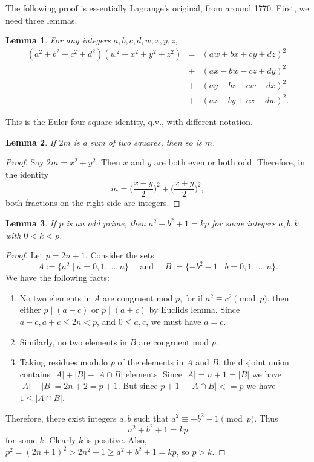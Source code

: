 \documentclass[12pt]{article}
\newtheorem{lem}{Lemma}
\begin{document}

The following proof is essentially Lagrange's original, from around 1770.  First, we need three lemmas.

\begin{lem} For any integers $a,b,c,d,w,x,y,z$, 
\begin{eqnarray*}
(a^2+b^2+c^2+d^2)(w^2+x^2+y^2+z^2) & = & (aw+bx+cy+dz)^2 \\
& + & (ax-bw-cz+dy)^2 \\
& + & (ay+bz-cw-dx)^2 \\
& + & (az-by+cx-dw)^2.
\end{eqnarray*}
\end{lem}
This is the Euler four-square identity, q.v., with different notation.

\begin{lem} If $2m$ is a sum of two squares, then so is $m$.\end{lem}

\begin{proof} Say $2m=x^2+y^2$. Then $x$ and $y$ are both even or both odd.
Therefore, in the identity $$m=\Big(\frac{x-y}{2}\Big)^2 +
\Big(\frac{x+y}{2}\Big)^2,$$
both fractions on the right side are integers. \end{proof}

\begin{lem} If $p$ is an odd prime,
then $a^2+b^2+1=kp$ for some integers $a,b,k$ with $0<k<p$. \end{lem}

\begin{proof} Let $p = 2n + 1$.  Consider the sets $$A:=\lbrace a^2 \mid a=0,1,...,n\rbrace\quad\mbox{ and }\quad B:=\lbrace -b^2-1 \mid b=0,1,...,n \rbrace.$$  We have the following facts:
\begin{enumerate}
\item No two elements in $A$ are congruent mod $p$, for if $a^2\equiv c^2 \pmod p$, then either $p\mid (a-c)$ or $p\mid (a+c)$ by Euclids lemma.  Since $a-c, a+c \le 2n< p$, and $0\le a,c$, we must have $a=c$.  
\item Similarly, no two elements in $B$ are congruent mod $p$.  
\item Taking residues modulo $p$ of the elements in $A$ and $B$, the disjoint union contains $\lvert A \rvert +\lvert B\rvert -\lvert A \cap B\rvert$ elements.
Since $\lvert A \rvert =n +1 =\lvert B \rvert$ we have $\lvert A\rvert +\lvert B \rvert =2n +2=p+1$.
But since $p+1 -\lvert A \cap B\rvert <=p$ we have $1 \leq \lvert A \cap B\rvert$.
\end{enumerate}
Therefore, there exist integers $a, b$ such that $a^2 \equiv -b^2 -1 \pmod p$. Thus $$a^2+b^2+1=kp$$
for some $k$. Clearly $k$ is positive. Also, $p^2 = (2n + 1)^2 > 2n^2 + 1 \ge a^2+b^2+1 = kp$, so $p > k$.
\end{proof}
\end{document}
